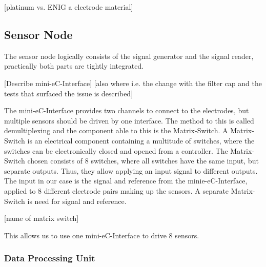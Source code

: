 [platinum vs. ENIG a electrode material]

\subsection{Sensor Node}

The sensor node logically consists of the signal generator and the signal reader, practically both parts are tightly integrated.

[Describe mini-eC-Interface]
[also where i.e. the change with the filter cap and the tests that surfaced the issue is described]

The mini-eC-Interface provides two channels to connect to the electrodes, but  multiple sensors should be driven by one interface. The method to this is called demultiplexing and the component able to this is the Matrix-Switch.
A Matrix-Switch is an electrical component containing a multitude of switches, where the switches can be electronically closed and opened from a controller. The Matrix-Switch chosen consists of 8 switches, where all switches have the same input, but separate outputs. Thus, they allow applying an input signal to different outputs. The input in our case is the signal and reference from the minie-eC-Interface, applied to 8 different electrode pairs making up the sensors. A separate Matrix-Switch is need for signal and reference.

[name of matrix switch]

This allows us to use one mini-eC-Interface to drive 8 sensors.

\subsubsection{Data Processing Unit}

